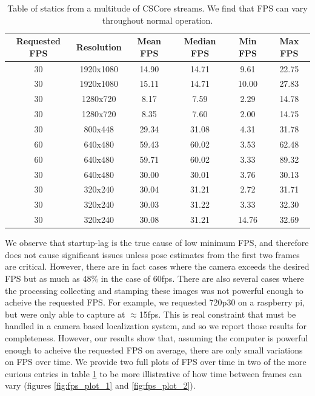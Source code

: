 \documentclass{article}
\begin{document}
    \begin{table}[H]
      \centering
      \begin{tabular}{|c|c|c|c|c|c|} \hline
        Requested FPS & Resolution & Mean FPS & Median FPS & Min FPS & Max FPS \\ \hline
        30 & 1920x1080 & 14.90 & 14.71 & 9.61 & 22.75 \\ \hline
        30 & 1920x1080 & 15.11 & 14.71 & 10.00 & 27.83 \\ \hline
        30 & 1280x720 & 8.17 & 7.59 & 2.29 & 14.78 \\ \hline
        30 & 1280x720 & 8.35 & 7.60 & 2.00 & 14.75 \\ \hline
        30 & 800x448 & 29.34 & 31.08  & 4.31 & 31.78 \\ \hline
        60 & 640x480 & 59.43 & 60.02 & 3.53 & 62.48 \\ \hline
        60 & 640x480 & 59.71 & 60.02 & 3.33 & 89.32 \\ \hline
        30 & 640x480 & 30.00 & 30.01 & 3.76 & 30.13 \\ \hline
        30 & 320x240 & 30.04 & 31.21 & 2.72 & 31.71 \\ \hline
        30 & 320x240 & 30.03 & 31.22 & 3.33 & 32.30 \\ \hline
        30 & 320x240 & 30.08 & 31.21 & 14.76 & 32.69 \\ \hline
      \end{tabular}
      \caption{Table of statics from a multitude of CSCore streams. We find that FPS can vary throughout normal operation.}
      \label{table:fps_stats}
    \end{table}

    We observe that startup-lag is the true cause of low minimum FPS, and therefore does not cause significant issues unless pose estimates from the first two frames are critical. However, there are in fact cases where the camera exceeds the desired FPS but as much as 48\% in the case of 60fps. There are also several cases where the processing collecting and stamping these images was not powerful enough to acheive the requested FPS. For example, we requested 720p30 on a raspberry pi, but were only able to capture at $\approx$15fps. This is real constraint that must be handled in a camera based localization system, and so we report those results for completeness. However, our results show that, assuming the computer is powerful enough to acheive the requested FPS on average, there are only small variations on FPS over time. We provide two full plots of FPS over time in two of the more curious entries in table \ref{table:fps_stats} to be more illistrative of how time between frames can vary (figures \ref{fig:fps_plot_1} and \ref{fig:fps_plot_2}).
\end{document}
